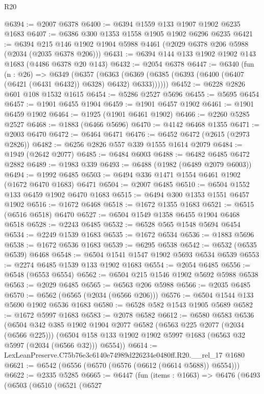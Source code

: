 \begin{lexlean}{R20}
\begin{coremodule}
@6394 := @2007 @6378
@6400 := @6394 @1559 @133 @1907 @1902 @6235 @1683
@6407 := @6386 @300 @1353 @1558 @1905 @1902 @6296 @6235
@6421 := @6394 @215 @146 @1902 @1904 @5988 @4461 (@2029 @6378 @206 @5988 (@2034 (@2035 @6378 @206)))
@6431 := @6394 @144 @133 @1902 @1902 @143 @1683 (@4486 @6378 @20 @143)
@6432 := @2054 @6378
@6447 := @6340
    (fun (n : @26) =>
    @6349
      (@6357
        (@6363 (@6369 (@6385 (@6393 (@6400 (@6407 (@6421 (@6431 @6432)) @6328) @6432) @6333))))))
@6452 := @6228 @2826 @601 @108 @1532 @1615
@6454 := @5286 @2527 @5696
@6455 := @5695 @6454
@6457 := @1901 @6455 @1904
@6459 := @1901 @6457 @1902
@6461 := @1901 @6459 @1902
@6464 := @1925 (@1901 @6461 @1902)
@6466 := @2260 @5285 @2527
@6468 := @1883 (@6466 @5696)
@6470 := @4142 @6468 @1355
@6471 := @2003 @6470
@6472 := @6464 @6471
@6476 := @6452 @6472 (@2615 (@2973 @2826))
@6482 := @6256 @2826 @557 @339 @1555 @1614 @2079
@6484 := @1949 (@2642 @2077)
@6485 := @6484 @6003
@6488 := @6482 @6485 @6472 @2882
@6489 := @1983 @339
@6493 := @6488 (@1982 (@6489 @2079 @6003))
@6494 := @1992 @6485
@6503 := @6494 @336 @1471 @1554 @6461 @1902 (@1672 @6470 @1683) @6471
@6504 := @2007 @6485
@6510 := @6504 @1552 @133 @6459 @1902 @6470 @1683
@6515 := @6494 @300 @1353 @1551 @6457 @1902
@6516 := @1672 @6468
@6518 := @1672 @1355 @1683
@6521 := @6515 (@6516 @6518) @6470
@6527 := @6504 @1549 @1358 @6455 @1904 @6468 @6518
@6528 := @2243 @6485
@6532 := @6528 @565 @1548 @5694 @6454
@6534 := @2249 @1539 @1683
@6535 := @1672 @6534
@6536 := @1883 @5696
@6538 := @1672 @6536 @1683
@6539 := @6295 @6538
@6542 := @6532 (@6535 @6539) @6468
@6548 := @6504 @1541 @1547 @1902 @5693 @6534 @6539
@6553 := @2274 @6485 @1539 @133 @1902 @1683
@6554 := @2054 @6485
@6556 := @6548 (@6553 @6554)
@6562 := @6504 @215 @1546 @1902 @5692 @5988 @6538
@6563 := @2029 @6485
@6565 := @6563 @206 @5988
@6566 := @2035 @6485
@6570 := @6562 (@6565 (@2034 (@6566 @206)))
@6576 := @6504 @1544 @133 @5690 @1902 @6536 @1683
@6580 := @6528 @582 @1543 @1905 @5689
@6582 := @1672 @5997 @1683
@6583 := @2078 @6582
@6612 := @6580
    @6583
    @6536
    (@6504
      @342
      @385
      @1902
      @1904
      @2077
      @6582
      (@6563 @225 @2077 (@2034 (@6566 @225)))
      (@6504 @158 @133 @1902 @1902 @5997 @1683 (@6563 @32 @5997 (@2034 (@6566 @32))) @6554))
@6614 := LexLeanPreserve.C75b76e3c6140e74989d226234e0480ff.R20.__rel_17 @1680
@6621 := @6542 (@6556 (@6570 (@6576 (@6612 (@6614 @5688)) @6554)))
@6622 := @2335 @5285
@6665 := @6447
    (fun (items : @1663) =>
    @6476
      (@6493
        (@6503
          (@6510
            (@6521
              (@6527

\end{coremodule}
\end{lexlean}

